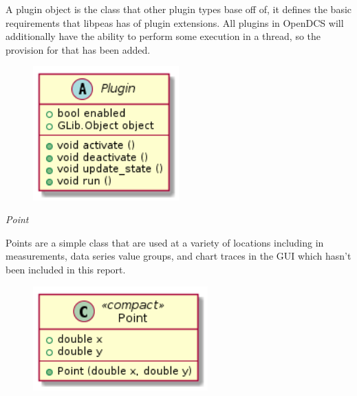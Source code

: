      \vspace*{-0.75cm}
      \begin{minipage}[t]{0.5\textwidth}
      	\vspace*{0.5cm}
        A plugin object is the class that other plugin types base off of, it
        defines the basic requirements that libpeas has of plugin extensions.
        All plugins in OpenDCS will additionally have the ability to perform
        some execution in a thread, so the provision for that has been added.
      \end{minipage} \hfill
      \begin{minipage}[t]{0.45\textwidth}
        \begin{figure}[H]
          \includegraphics[width=0.5\textwidth]{figures/design/class/core/plugin}
          \label{fig:dsg-classes-plugin}
        \end{figure}
      \end{minipage}

      \emph{Point}

      \vspace*{-0.75cm}
      \begin{minipage}[t]{0.5\textwidth}
      	\vspace*{0.5cm}
        Points are a simple class that are used at a variety of locations
        including in measurements, data series value groups, and chart traces
        in the GUI which hasn't been included in this report.
      \end{minipage} \hfill
      \begin{minipage}[t]{0.45\textwidth}
        \begin{figure}[H]
          \includegraphics[width=0.6\textwidth]{figures/design/class/core/point}
          \label{fig:dsg-classes-point}
        \end{figure}
      \end{minipage}

